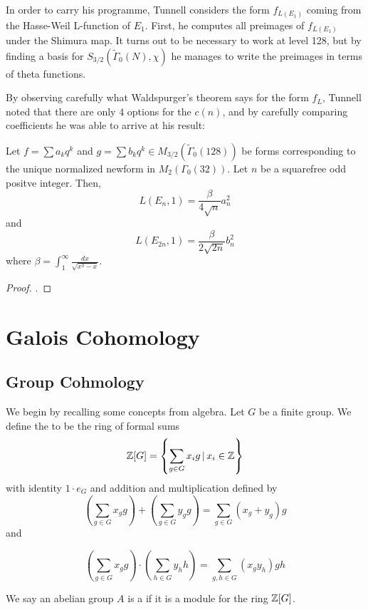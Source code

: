 \documentclass[12pt, a4paper]{report}
\begin{document}
In order to carry his programme, Tunnell considers the form $f_{L(E_1)}$ coming
from the Hasse-Weil L-function of $E_1$.  First, he computes all preimages of
$f_{L(E_1)}$
under the Shimura map.
It turns out to be necessary to work at level 128, but by finding a basis
for $S_{3/2}(\tilde{\Gamma}_0(N), \chi)$ he manages to write the preimages in
terms of theta functions.

By observing carefully what Waldspurger's theorem
says for the form $f_L$, Tunnell noted that
there are only 4 options for the $c(n)$, and by carefully comparing coefficients
he was able to arrive at his result:

\begin{thm}
  Let $f = \sum a_k q^k$ and $g = \sum b_k q^k \in
  M_{3/2}(\tilde{\Gamma}_0(128))$ be forms corresponding to the unique
  normalized newform
  in $M_2(\Gamma_0(32))$. Let $n$ be a squarefree odd positve integer. Then,
  \[L(E_n,1) = \frac{\beta}{4\sqrt{n}} a_n^2 \]
  and
  \[L(E_{2n},1) = \frac{\beta}{2 \sqrt{2n}} b_n^2 \]
  where $\beta = \int_1^\infty \frac{dx}{\sqrt{x^3-x}}.$
\end{thm}
\begin{proof}
  \cite[See][Theorem 3, Page 328-329]{Tunnell}.
\end{proof}

\newpage

\chapter{Galois Cohomology}

\section{Group Cohmology}

We begin by recalling some concepts from algebra.
Let $G$ be a finite group. We define the  to
be the ring of formal sums
\[ {\mathbb Z}[G] = \left\{ \sum\limits_{g \in G} x_i g \, | \, x_i \in {\mathbb Z}  \right\} \]
with identity $1 \cdot e_G$ and addition and multiplication defined by
\[\left( \sum\limits_{g \in G} x_g g \right) + \left( \sum\limits_{g \in G} y_g
    g \right)
= \sum\limits_{g \in G} (x_g+y_g)g\]
and

\[\left( \sum\limits_{g \in G} x_g g \right) \cdot \left( \sum\limits_{h \in G} y_h
    h \right)
= \sum\limits_{g, h \in G} (x_gy_h)gh\]

We say an abelian group $A$ is a  if it is a module
for the ring ${\mathbb Z}[G]$. 
\end{document}

